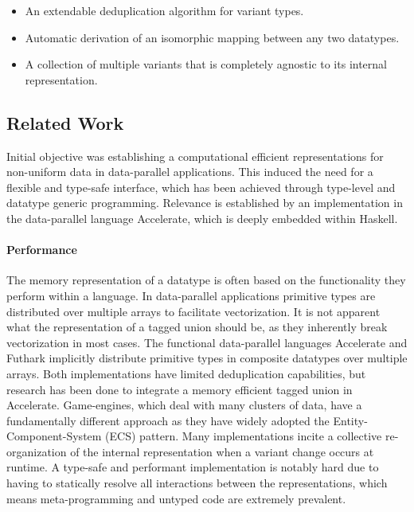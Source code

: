 \documentclass{article}
\begin{document}
\begin{itemize}
    \item An extendable deduplication algorithm for variant types. 
    \item Automatic derivation of an isomorphic mapping between any two datatypes. 
    \item A collection of multiple variants that is completely agnostic to its internal representation.
\end{itemize}

\newpage

\subsection{Related Work}

Initial objective was establishing a computational efficient representations for non-uniform data in data-parallel applications.
This induced the need for a flexible and type-safe interface, which has been achieved through type-level and datatype generic programming.
Relevance is established by an implementation in the data-parallel language Accelerate, which is deeply embedded within Haskell.

\paragraph{Performance}

The memory representation of a datatype is often based on the functionality they perform within a language.
In data-parallel applications primitive types are distributed over multiple arrays to facilitate vectorization.
It is not apparent what the representation of a tagged union should be, as they inherently break vectorization in most cases. 
The functional data-parallel languages Accelerate\cite{accelerate-sum-types} and Futhark\cite{futhark-sum-types} implicitly distribute primitive types in composite datatypes over multiple arrays.
Both implementations have limited deduplication capabilities, but research has been done to integrate a memory efficient tagged union in Accelerate\cite{accelerate-sum-types}.
Game-engines, which deal with many clusters of data, have a fundamentally different approach as they have widely adopted the Entity-Component-System (ECS) pattern. 
Many implementations incite a collective re-organization of the internal representation when a variant change occurs at runtime.
A type-safe and performant implementation is notably hard due to having to statically resolve all interactions between the representations, which means meta-programming and untyped code are extremely prevalent. 
\end{document}
